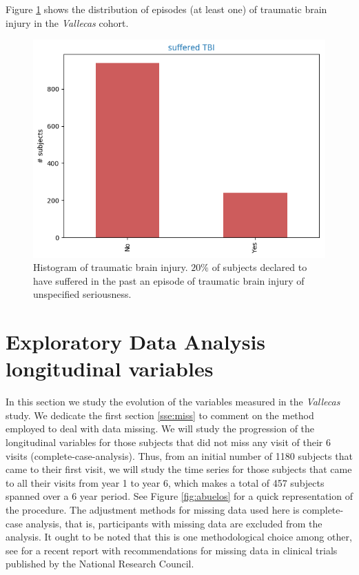 \documentclass[11pt]{article}
\theoremstyle{definition}
\theoremstyle{remark}
\begin{document}
Figure \ref{fig:tce} shows the distribution of episodes (at least one) of traumatic brain injury in the \emph{Vallecas} cohort. 

\begin{figure}[H]
        \centering
        \includegraphics[keepaspectratio, width=0.6\linewidth]{figures/Fig_tce}
        \caption{Histogram of traumatic brain injury. $20\%$ of subjects declared to have suffered in the past an episode of traumatic brain injury of unspecified seriousness.} 
        \label{fig:tce}
\end{figure}

\section{Exploratory Data Analysis longitudinal variables}
\label{se:eda_long}
In this section we study the evolution of the variables measured in the \emph{Vallecas} study. We dedicate the first section \ref{sse:miss} to comment on the method employed to deal with data missing. 
We will study the progression of the longitudinal variables for those subjects that did not miss any visit of their 6 visits (complete-case-analysis). Thus, from an initial number of 1180 subjects that came to their first visit, we will study the time series for those subjects that came to all their visits from year 1 to year 6, which makes a total of 457 subjects spanned over a 6 year period. See Figure \ref{fig:abuelos} for a quick  representation of the procedure.
The adjustment methods for missing data used here is complete-case analysis, that is, participants with missing data are excluded from the analysis. It ought to be noted that this is one methodological choice among other, see \cite{national2010prevention} for a recent report with recommendations for missing data in clinical trials published by the National Research Council. 
\end{document}

